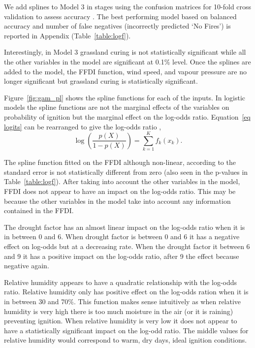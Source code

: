 \documentclass[11pt,a4paper]{article}
\begin{document}
We add splines to Model 3 in stages using the confusion matrices for 10-fold cross validation to assess accuracy \citep[][using the caret package by]{caret}. The best performing model based on balanced accuracy and number of false negatives (incorrectly predicted `No Fires') is reported in Appendix (Table~\ref{table:logf}).

Interestingly, in Model 3 grassland curing is not statistically significant while all the other variables in the model are significant at 0.1\% level. Once the splines are added to the model, the FFDI function, wind speed, and vapour pressure are no longer significant but grassland curing is statistically significant.

Figure~\ref{fig:gam_pl} shows the spline functions for each of the inputs. In logistic models the spline functions are not the marginal effects of the variables on probability of ignition but the marginal effect on the log-odds ratio. Equation~\eqref{eq logits} can be rearranged to give the log-odds ratio \citep{james13},
\begin{equation}
  \label{eq:logodds}
  \log(\frac{p(X)}{1-p(X)}) = \sum_{k=1}^{K} f_k (x_k).
\end{equation}

The spline function fitted on the FFDI although non-linear, according to the standard error is not statistically different from zero (also seen in the p-values in Table~\ref{table:logf}). After taking into account the other variables in the model, FFDI does not appear to have an impact on the log-odds ratio. This may be because the other variables in the model take into account any information contained in the FFDI.

The drought factor has an almost linear impact on the log-odds ratio when it is in between 0 and 6. When drought factor is between 0 and 6 it has a negative effect on log-odds but at a decreasing rate. When the drought factor it between 6 and 9 it has a positive impact on the log-odds ratio, after 9 the effect because negative again.

Relative humidity appears to have a quadratic relationship with the log-odds ratio. Relative humidity only has positive effect on the log-odds ration when it is in between 30 and 70\%. This function makes sense intuitively as when relative humidity is very high there is too much moisture in the air (or it is raining) preventing ignition. When relative humidity is very low it does not appear to have a statistically significant impact on the log-odd ratio. The middle values for relative humidity would correspond to warm, dry days, ideal ignition conditions.
\end{document}
